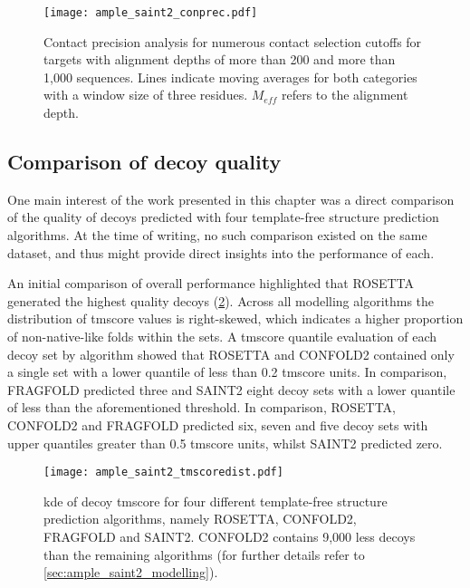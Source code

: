 \begin{figure}[H]
    \centering
    \texttt{[image: ample\_saint2\_conprec.pdf]}
    \caption[Contact predicion analysis for numerous contact selection cutoffs]{Contact precision analysis for numerous contact selection cutoffs for targets with alignment depths of more than 200 and more than 1,000 sequences. Lines indicate moving averages for both categories with a window size of three residues. $M_{eff}$ refers to the alignment depth.}
    \label{fig:ample_saint2_conprec}
\end{figure}

\subsection{Comparison of decoy quality}
One main interest of the work presented in this chapter was a direct comparison of the quality of decoys predicted with four template-free structure prediction algorithms. At the time of writing, no such comparison existed on the same dataset, and thus might provide direct insights into the performance of each.

An initial comparison of overall performance highlighted that ROSETTA generated the highest quality decoys (\cref{fig:ample_saint2_tmscoredist}). Across all modelling algorithms the distribution of \gls{tmscore} values is right-skewed, which indicates a higher proportion of non-native-like folds within the sets. A \gls{tmscore} quantile evaluation of each decoy set by algorithm showed that ROSETTA and CONFOLD2 contained only a single set with a lower quantile of less than 0.2 \gls{tmscore} units. In comparison, FRAGFOLD predicted three and SAINT2 eight decoy sets with a lower quantile of less than the aforementioned threshold. In comparison, ROSETTA, CONFOLD2 and FRAGFOLD predicted six, seven and five decoy sets with upper quantiles greater than 0.5 \gls{tmscore} units, whilst SAINT2 predicted zero.

\begin{figure}[H]
    \centering
    \texttt{[image: ample\_saint2\_tmscoredist.pdf]}
    \caption[Distribution of decoy TM-scores for four modelling algorithms]{\gls{kde} of decoy \gls{tmscore} for four different template-free structure prediction algorithms, namely ROSETTA, CONFOLD2, FRAGFOLD and SAINT2. CONFOLD2 contains 9,000 less decoys than the remaining algorithms (for further details refer to \cref{sec:ample_saint2_modelling}).}
    \label{fig:ample_saint2_tmscoredist}
\end{figure}

